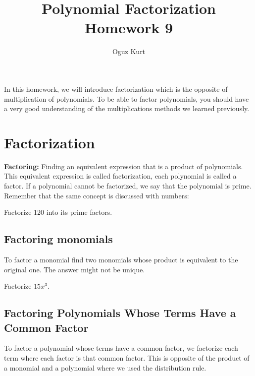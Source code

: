 \documentclass{ximera}
\title{Polynomial Factorization \\ Homework 9}
\author{Oguz Kurt}
\begin{document}
\maketitle
{}
In this homework, we will introduce factorization which is the opposite of multiplication of polynomials. To be able to factor polynomials, you should have a very good understanding of the multiplications methods we learned previously. \\

\section{Factorization}

{\bf Factoring:} Finding an equivalent expression that is a product of polynomials. This equivalent expression is called factorization, each polynomial is called a factor. If a polynomial cannot be factorized, we say that the polynomial is prime.\\

Remember that the same concept is discussed with numbers:\\

\begin{problem}
Factorize 120 into its prime factors.\\
\end{problem}
 
\subsection{Factoring monomials}

To factor a monomial find two monomials whose product is equivalent to the original one. The answer might not be unique.\\

\begin{problem} 
Factorize $15 x^3$.\\
\end{problem}

 
\subsection{Factoring Polynomials Whose Terms Have a Common Factor}

To factor a polynomial whose terms have a common factor, we factorize each term where each factor is that common factor. This is opposite of the product of a monomial and a polynomial where we used the distribution rule. \\
\end{document}
